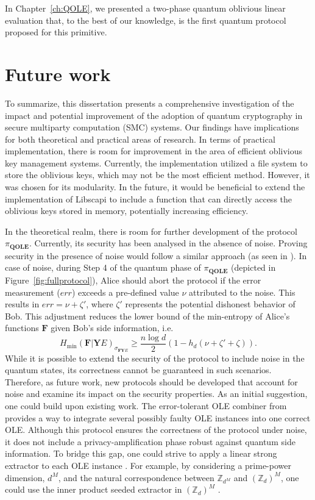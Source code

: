In Chapter~\ref{ch:QOLE}, we presented a two-phase quantum oblivious linear evaluation that, to the best of our knowledge, is the first quantum protocol proposed for this primitive.

\section{Future work}

To summarize, this dissertation presents a comprehensive investigation of the impact and potential improvement of the adoption of quantum cryptography in secure multiparty computation (SMC) systems. Our findings have implications for both theoretical and practical areas of research. In terms of practical implementation, there is room for improvement in the area of efficient oblivious key management systems. Currently, the implementation utilized a file system to store the oblivious keys, which may not be the most efficient method. However, it was chosen for its modularity. In the future, it would be beneficial to extend the implementation of Libscapi to include a function that can directly access the oblivious keys stored in memory, potentially increasing efficiency.

In the theoretical realm, there is room for further development of the protocol $\pi_{\textbf{QOLE}}$. Currently, its security has been analysed in the absence of noise. Proving security in the presence of noise would follow a similar approach (as seen in \cite{DFLSS09}). In case of noise, during Step 4 of the quantum phase of $\pi_{\textbf{QOLE}}$ (depicted in Figure~\ref{fig:fullprotocol}), Alice should abort the protocol if the error measurement ($err$) exceeds a pre-defined value $\nu$ attributed to the noise. This results in $err = \nu + \zeta '$, where $\zeta '$ represents the potential dishonest behavior of Bob. This adjustment reduces the lower bound of the min-entropy of Alice's functions $\mathbf{F}$ given Bob's side information, i.e.
$$H_{\min}(\mathbf{F} | \mathbf{Y} E)_{\sigma_{\mathbf{F}\mathbf{Y} E}} \geq \frac{n\log d}{2}\left(1 - h_d(\nu + \zeta ' + \zeta)\right).$$
While it is possible to extend the security of the protocol to include noise in the quantum states, its correctness cannot be guaranteed in such scenarios. Therefore, as future work, new protocols should be developed that account for noise and examine its impact on the security properties. As an initial suggestion, one could build upon existing work. The error-tolerant OLE combiner from \cite{PW08} provides a way to integrate several possibly faulty OLE instances into one correct OLE. Although this protocol ensures the correctness of the protocol under noise, it does not include a privacy-amplification phase robust against quantum side information. To bridge this gap, one could strive to apply a linear strong extractor to each OLE instance \cite{DPV+12}. For example, by considering a prime-power dimension, $d^M$, and the natural correspondence between $\mathbb{Z}_{d^M}$ and $(\mathbb{Z}_d)^M$, one could use the inner product seeded extractor in $(\mathbb{Z}_d)^M$ \cite{KK10}.


